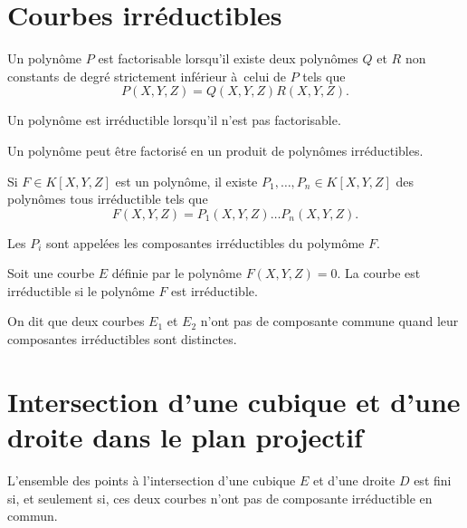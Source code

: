 \section{Courbes irréductibles}

\begin{definition}
    \label{def:polyIrr}
    Un polynôme $P$ est factorisable lorsqu'il existe deux polynômes $Q$ et $R$ non
    constants de degré strictement inférieur à celui de $P$ tels que
    \[
    P(X,Y,Z) = Q(X,Y,Z)R(X,Y,Z)
    .\] 

    Un polynôme est irréductible lorsqu'il n'est pas factorisable.

    Un polynôme peut être factorisé en un produit de polynômes irréductibles. 

    Si $F
    \in K[X,Y,Z]$ est un polynôme, il existe $P_1,\ldots,P_{n} \in K[X,Y,Z]$ des polynômes
    tous
    irréductible tels que
    \[
    F(X,Y,Z)= P_1(X,Y,Z)\ldots P_{n}(X,Y,Z)
    .\] 

    Les $P_{i}$ sont appelées les composantes irréductibles du polymôme $F$.
\end{definition}

\begin{definition}
    \label{def:courbeIrr}
    
    Soit une courbe $E$ définie par le polynôme $F(X,Y,Z) = 0$. La courbe est irréductible si
    le polynôme $F$ est irréductible.
\end{definition}

On dit que deux courbes $E_1$ et $E_2$ n'ont pas de composante commune quand leur
composantes irréductibles sont distinctes.

\section{Intersection d'une cubique et d'une droite dans le plan projectif}

\begin{proposition}
    \label{prop:intersectionED}
    
    L'ensemble des points à l'intersection d'une cubique $E$ et d'une droite $D$ est fini si, et
    seulement si, ces deux courbes n'ont pas de composante irréductible en commun.
\end{proposition}

